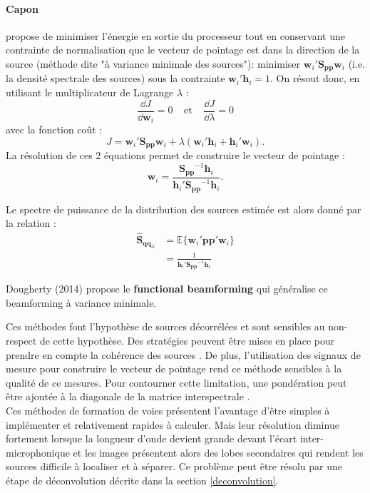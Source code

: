 \paragraph{\tbullet Capon}  \cite{Capon1969} propose de minimiser l'énergie en sortie du processeur tout en conservant une contrainte de normalisation que le vecteur de pointage est dans la direction de la source (méthode dite "à variance minimale des sources"): minimiser $\bm{w}_i'\bm{S_{pp}}\bm{w}_i$ (i.e. la densité spectrale des sources) sous la contrainte $\bm{w}_i'\bm{h}_i=1$.
On résout donc, en utilisant le multiplicateur de Lagrange $\lambda$ : 
\begin{equation}
\frac{\dd J}{\dd\bm{w}_i}=0~~~~~\text{et}~~~~~\frac{\dd J}{\dd\lambda}=0
\end{equation}
avec la fonction coût : 
\begin{equation}
J=\bm{w}_i'\bm{S_{pp}}\bm{w}_i + \lambda(\bm{w}_i'\bm{h}_i+\bm{h}_i'\bm{w}_i).
\end{equation}
La résolution de ces 2 équations permet de construire le vecteur de pointage : 
\begin{equation}
	\bm{w}_i=\frac{\bm{S_{pp}}^{-1}\bm{h}_{i}}{\bm{h}_i'\bm{S_{pp}}^{-1}\bm{h}_{i}}.
\end{equation}

Le spectre de puissance de la distribution des sources estimée est alors donné par la relation : 
\begin{align}
	\bm{\hat{S}}_{\bm{qq}_{ii}} & = \mathbb{E}\{ \bm{w}_i'\bm{pp}'\bm{w}_i\}\\
	&=\frac{1}{\bm{h}_i'\bm{S_{pp}}^{-1}\bm{h}_i}\label{Gii}
\end{align}

Dougherty (2014) propose le \textbf{functional beamforming} qui généralise ce beamforming à variance minimale.



Ces méthodes font l'hypothèse de sources décorrélées et sont sensibles au non-respect de cette hypothèse. Des stratégies peuvent être mises en place pour prendre en compte la cohérence des sources \citep{Jiang2003}. De plus, l'utilisation des signaux de mesure pour construire le vecteur de pointage rend ce méthode sensibles à la qualité de ce mesures. Pour contourner cette limitation, une pondération peut être ajoutée à la diagonale de la matrice interspectrale \citep{Li2003}.\\

Ces méthodes de formation de voies présentent l'avantage d'être simples à implémenter et relativement rapides à calculer. Mais leur résolution diminue fortement lorsque la longueur d'onde devient grande devant l'écart inter-microphonique et les images présentent alors des lobes secondaires qui rendent les sources difficile à localiser et à séparer. Ce problème peut être résolu par une étape de déconvolution décrite dans la section \ref{deconvolution}.\\

